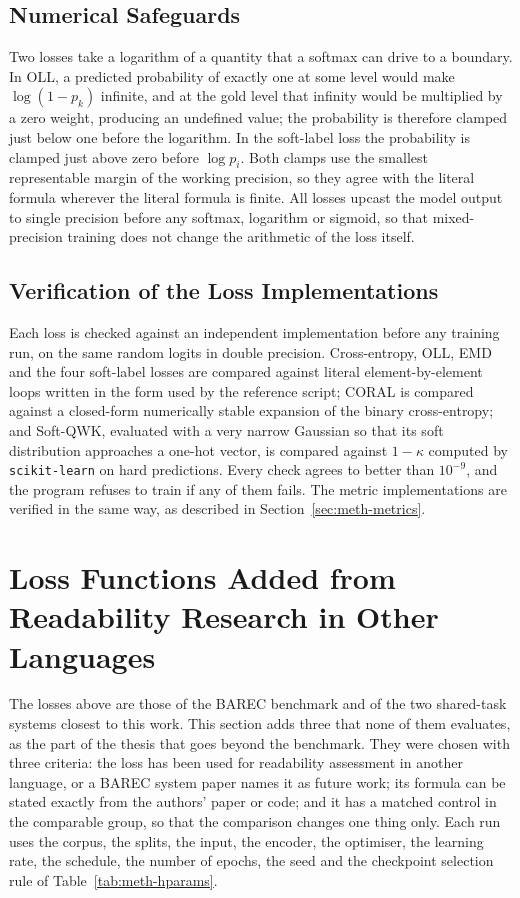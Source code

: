\subsection{Numerical Safeguards}

Two losses take a logarithm of a quantity that a softmax can drive to a boundary. In OLL, a
predicted probability of exactly one at some level would make $\log(1-p_k)$ infinite, and at
the gold level that infinity would be multiplied by a zero weight, producing an undefined
value; the probability is therefore clamped just below one before the logarithm. In the
soft-label loss the probability is clamped just above zero before $\log p_i$. Both clamps use
the smallest representable margin of the working precision, so they agree with the literal
formula wherever the literal formula is finite. All losses upcast the model output to
single precision before any softmax, logarithm or sigmoid, so that mixed-precision training
does not change the arithmetic of the loss itself.

\subsection{Verification of the Loss Implementations}

Each loss is checked against an independent implementation before any training run, on the same
random logits in double precision. Cross-entropy, OLL, EMD and the four soft-label losses are
compared against literal element-by-element loops written in the form used by the reference
script; CORAL is compared against a closed-form numerically stable expansion of the binary
cross-entropy; and Soft-QWK, evaluated with a very narrow Gaussian so that its soft
distribution approaches a one-hot vector, is compared against $1-\kappa$ computed by
\texttt{scikit-learn} on hard predictions. Every check agrees to better than $10^{-9}$, and the
program refuses to train if any of them fails. The metric implementations are verified in the
same way, as described in Section~\ref{sec:meth-metrics}.

\section{Loss Functions Added from Readability Research in Other Languages}
\label{sec:meth-newlosses}

The losses above are those of the BAREC benchmark and of the two shared-task systems closest to
this work. This section adds three that none of them evaluates, as the part of the thesis that
goes beyond the benchmark. They were chosen with three criteria: the loss has been used for
readability assessment in another language, or a BAREC system paper names it as future work; its
formula can be stated exactly from the authors' paper or code; and it has a matched control in
the comparable group, so that the comparison changes one thing only. Each run uses the corpus, the
splits, the input, the encoder, the optimiser, the learning rate, the schedule, the number of
epochs, the seed and the checkpoint selection rule of Table~\ref{tab:meth-hparams}.

